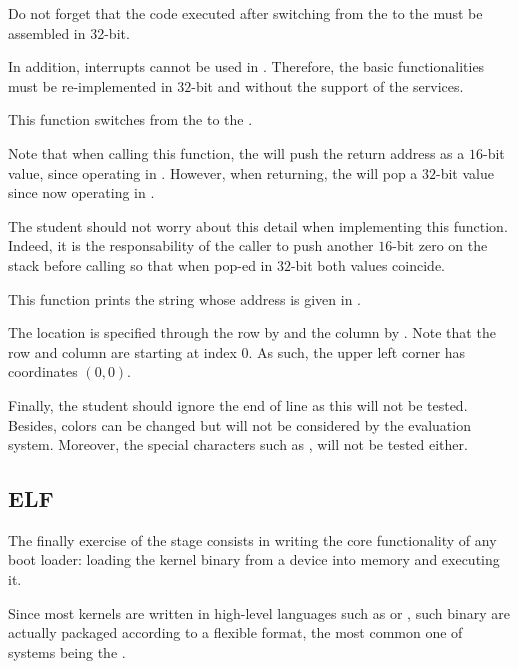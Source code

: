 Do not forget that the code executed after switching from the 
to the  must be assembled in 32-bit.

In addition,  interrupts cannot be used in .
Therefore, the basic functionalities must be re-implemented in $32$-bit and
without the support of the  services.

{
  This function switches from the  to the .

  \-

  Note that when calling this function, the  will push the return
  address as a $16$-bit value, since operating in . However,
  when returning, the  will pop a $32$-bit value since now operating
  in .

  \-

  The student should not worry about this detail when implementing this
  function. Indeed, it is the responsability of the caller to push another
  $16$-bit zero on the stack before calling so that when pop-ed in $32$-bit
  both values coincide.
}

{
  This function prints the string whose address is given in .

  \-

  The location is specified through the row by  and the
  column by . Note that the row and column are starting at
  index 0. As such, the upper left corner has coordinates $(0,0)$.

  \-

  Finally, the student should ignore the end of line as this will not be
  tested. Besides, colors can be changed but will not be considered by
  the evaluation system. Moreover, the special characters such as ,
   \etc{} will not be tested either.
}

\subsection{ELF}

The finally exercise of the  stage consists in writing the core
functionality of any boot loader: loading the kernel binary from a device
into memory and executing it.

Since most kernels are written in high-level languages such as  or
, such binary are actually packaged according to a flexible format,
the most common one of  systems being the .

